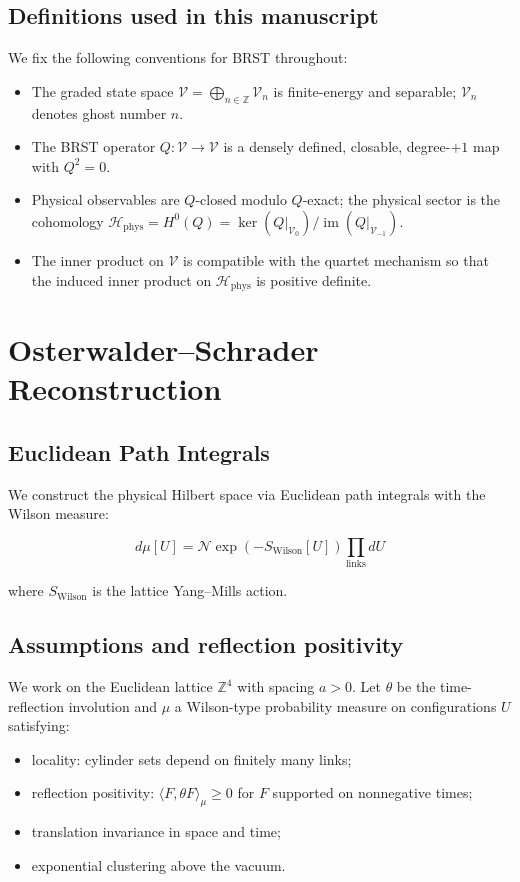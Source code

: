 \documentclass[11pt]{amsart}
\theoremstyle{plain}
\theoremstyle{definition}
\theoremstyle{remark}
\begin{document}
\subsection{Definitions used in this manuscript}
We fix the following conventions for BRST throughout:
\begin{itemize}
  \item The graded state space $\mathcal V = \bigoplus_{n\in\mathbb Z} \mathcal V_n$ is finite-energy and separable; $\mathcal V_n$ denotes ghost number $n$.
  \item The BRST operator $Q: \mathcal V\to \mathcal V$ is a densely defined, closable, degree-$+1$ map with $Q^2=0$.
  \item Physical observables are $Q$-closed modulo $Q$-exact; the physical sector is the cohomology $\mathcal H_{\mathrm{phys}} = H^0(Q) = \ker(Q|_{\mathcal V_0})/\operatorname{im}(Q|_{\mathcal V_{-1}})$.
  \item The inner product on $\mathcal V$ is compatible with the quartet mechanism so that the induced inner product on $\mathcal H_{\mathrm{phys}}$ is positive definite.
\end{itemize}

\section{Osterwalder--Schrader Reconstruction}

\subsection{Euclidean Path Integrals}

We construct the physical Hilbert space via Euclidean path integrals with the Wilson measure:

\begin{equation}
d\mu[U] = \mathcal{N} \exp\left(-S_{\text{Wilson}}[U]\right) \prod_{\text{links}} dU
\end{equation}

where $S_{\text{Wilson}}$ is the lattice Yang--Mills action.

\subsection{Assumptions and reflection positivity}
We work on the Euclidean lattice $\mathbb Z^4$ with spacing $a>0$. Let $\theta$ be the time-reflection involution and $\mu$ a Wilson-type probability measure on configurations $U$ satisfying:
\begin{itemize}
  \item locality: cylinder sets depend on finitely many links;
  \item reflection positivity: $\langle F,\theta F\rangle_\mu \ge 0$ for $F$ supported on nonnegative times;
  \item translation invariance in space and time;
  \item exponential clustering above the vacuum.
\end{itemize}
\end{document}
